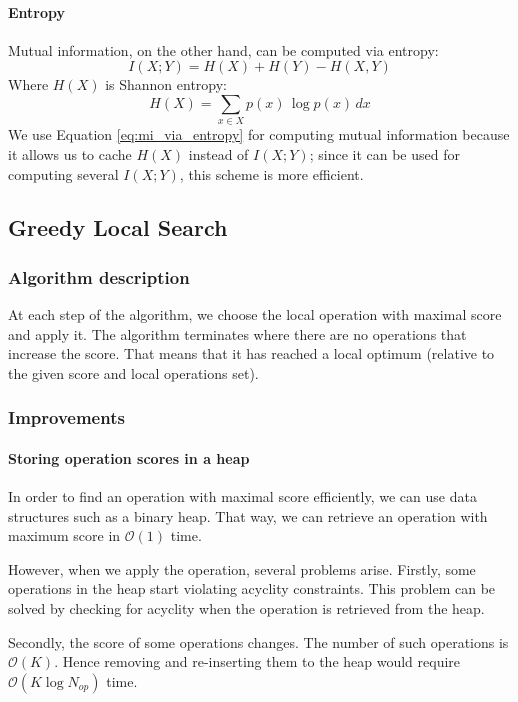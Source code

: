 \documentclass{article}
\newcommand{\bigO}[1]{\mathcal{O}{(#1)}}
\begin{document}
\paragraph{Entropy} 
Mutual information, on the other hand, can be computed via entropy:
\begin{equation}
\label{eq:mi_via_entropy}
I(X; Y) = H(X) + H(Y) - H(X, Y)
\end{equation}
Where $H(X)$ is Shannon entropy:
\begin{equation}
H(X) = \sum_{x \in X}{p(x)\,\log p(x)\,dx}
\end{equation}
We use Equation \ref{eq:mi_via_entropy} for computing mutual information because it allows us to cache $H(X)$ instead of $I(X; Y)$; since it can be used for computing several $I(X; Y)$, this scheme is more efficient.

\subsection{Greedy Local Search}
\subsubsection{Algorithm description}
At each step of the algorithm, we choose the local operation with maximal score and apply it. The algorithm terminates where there are no operations that increase the score. That means that it has reached a local optimum (relative to the given score and local operations set).

\subsubsection{Improvements}
\paragraph{Storing operation scores in a heap} In order to find an operation with maximal score efficiently, we can use data structures such as a binary heap. That way, we can retrieve an operation with maximum score in $\bigO{1}$ time.

However, when we apply the operation, several problems arise. Firstly, some operations in the heap start violating acyclity constraints. This problem can be solved by checking for acyclity when the operation is retrieved from the heap. 

Secondly, the score of some operations changes. The number of such operations is $\bigO{K}$. Hence removing and re-inserting them to the heap would require $\bigO{K \log{N_{op}}}$ time. 
\end{document}
